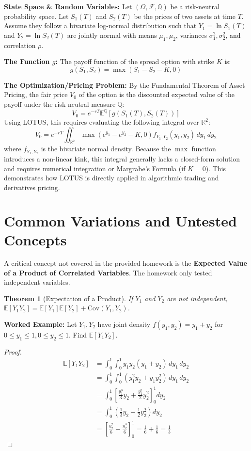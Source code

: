 \documentclass[11pt, a4paper]{article}
\newtheorem{theorem}{Theorem}[section]
\theoremstyle{definition}
\theoremstyle{remark}
\newcommand{\R}{\mathbb{R}}
\newcommand{\E}{\mathbb{E}}
\newcommand{\F}{\mathcal{F}}
\begin{document}
\textbf{State Space \& Random Variables:}
Let $(\Omega, \F, \mathbb{Q})$ be a risk-neutral probability space. Let $S_1(T)$ and $S_2(T)$ be the prices of two assets at time $T$. Assume they follow a bivariate log-normal distribution such that $Y_1 = \ln S_1(T)$ and $Y_2 = \ln S_2(T)$ are jointly normal with means $\mu_1, \mu_2$, variances $\sigma_1^2, \sigma_2^2$, and correlation $\rho$.

\textbf{The Function $g$:}
The payoff function of the spread option with strike $K$ is:
\[
g(S_1, S_2) = \max(S_1 - S_2 - K, 0)
\]

\textbf{The Optimization/Pricing Problem:}
By the Fundamental Theorem of Asset Pricing, the fair price $V_0$ of the option is the discounted expected value of the payoff under the risk-neutral measure $\mathbb{Q}$:
\[
V_0 = e^{-rT} \E^{\mathbb{Q}}[g(S_1(T), S_2(T))]
\]
Using LOTUS, this requires evaluating the following integral over $\R^2$:
\[
V_0 = e^{-rT} \iint_{\R^2} \max(e^{y_1} - e^{y_2} - K, 0) f_{Y_1, Y_2}(y_1, y_2) \, dy_1 \, dy_2
\]
where $f_{Y_1, Y_2}$ is the bivariate normal density. Because the $\max$ function introduces a non-linear kink, this integral generally lacks a closed-form solution and requires numerical integration or Margrabe's Formula (if $K=0$). This demonstrates how LOTUS is directly applied in algorithmic trading and derivatives pricing.

\section{Common Variations and Untested Concepts}

A critical concept not covered in the provided homework is the \textbf{Expected Value of a Product of Correlated Variables}. The homework only tested independent variables.

\begin{theorem}[Expectation of a Product]
If $Y_1$ and $Y_2$ are \textit{not} independent, $\E[Y_1 Y_2] = \E[Y_1]\E[Y_2] + \text{Cov}(Y_1, Y_2)$.
\end{theorem}

\textbf{Worked Example:}
Let $Y_1, Y_2$ have joint density $f(y_1, y_2) = y_1 + y_2$ for $0 \leq y_1 \leq 1, 0 \leq y_2 \leq 1$. Find $\E[Y_1 Y_2]$.
\begin{proof}
\begin{align*}
\E[Y_1 Y_2] &= \int_{0}^{1} \int_{0}^{1} y_1 y_2 (y_1 + y_2) \, dy_1 \, dy_2 \\
&= \int_{0}^{1} \int_{0}^{1} (y_1^2 y_2 + y_1 y_2^2) \, dy_1 \, dy_2 \\
&= \int_{0}^{1} \left[ \frac{y_1^3}{3} y_2 + \frac{y_1^2}{2} y_2^2 \right]_{0}^{1} dy_2 \\
&= \int_{0}^{1} \left( \frac{1}{3} y_2 + \frac{1}{2} y_2^2 \right) dy_2 \\
&= \left[ \frac{y_2^2}{6} + \frac{y_2^3}{6} \right]_{0}^{1} = \frac{1}{6} + \frac{1}{6} = \frac{1}{3}
\end{align*}
\end{proof}
\end{document}
